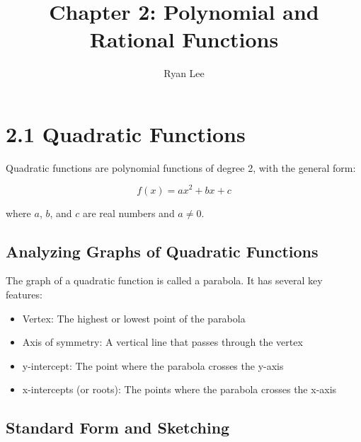 \documentclass[12pt]{article}
\title{Chapter 2: Polynomial and Rational Functions}
\author{Ryan Lee}
\date{}
\begin{document}
\maketitle

\section{2.1 Quadratic Functions}

Quadratic functions are polynomial functions of degree 2, with the general form:

\[f(x) = ax^2 + bx + c\]

where $a$, $b$, and $c$ are real numbers and $a \neq 0$.

\subsection{Analyzing Graphs of Quadratic Functions}

The graph of a quadratic function is called a parabola. It has several key features:

\begin{itemize}
    \item Vertex: The highest or lowest point of the parabola
    \item Axis of symmetry: A vertical line that passes through the vertex
    \item y-intercept: The point where the parabola crosses the y-axis
    \item x-intercepts (or roots): The points where the parabola crosses the x-axis
\end{itemize}

\begin{center}
\end{center}

\subsection{Standard Form and Sketching}
\end{document}
